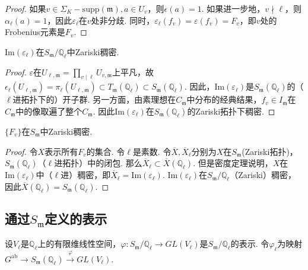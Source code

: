 \begin{proof}
    如果$v\in \Sigma_K - \mathrm{supp}(\mathfrak{m}), a\in U_v$，则$\epsilon(a) = 1$. 如果进一步地，$v\nmid \ell$，则$\alpha_{\ell}(a) = 1$，因此$\varepsilon_{\ell}$在$v$处非分歧. 同时，$\varepsilon_{\ell}(f_v)=\varepsilon(f_v) = F_v$，即$v$处的Frobenius元素是$F_v$.
\end{proof}

\begin{cthm}
    $\mathrm{Im}(\varepsilon_{\ell})$在$S_{\mathfrak{m}}/\mathbb{Q}_{\ell}$中Zariski稠密.
\end{cthm}

\begin{proof}
    $\varepsilon$在$U_{\ell, \mathfrak{m}} = \prod_{v\mid \ell} U_{v, \mathfrak{m}}$上平凡，故$\epsilon_{\ell}(U_{\ell, \mathfrak{m}}) = \pi_{\ell}(U_{\ell, \mathfrak{m}})\subset T_{\mathfrak{m}}(\mathbb{Q}_{\ell}) \subset S_{\mathfrak{m}}(\mathbb{Q}_{\ell})$. 因此，$\mathrm{Im}(\varepsilon_{\ell})$是$S_{\mathfrak{m}}(\mathbb{Q}_{\ell})$的（$\ell$进拓扑下的）开子群. 另一方面，由素理想在$C_{\mathfrak{m}}$中分布的经典结果，$f_v\in I_{\mathfrak{m}}$在$C_{\mathfrak{m}}$中的像取遍了整个$C_{\mathfrak{m}}$.
    因此$\mathrm{Im}(\varepsilon_{\ell})$在$S_{\mathfrak{m}}(\mathbb{Q}_{\ell})$的Zariski拓扑下稠密.
\end{proof}

\begin{ccor}
    $\{F_v\}$在$S_{\mathfrak{m}}$中Zariski稠密. \label{frob_dense}
\end{ccor}

\begin{proof}
    令$X$表示所有$F_v$的集合. 令$\ell$是素数. 令$\overline{X}, \overline{X}_{\ell}$分别为$X$在$S_{\mathfrak{m}}$(Zariski拓扑)，$S_{\mathfrak{m}}(\mathbb{Q}_{\ell})$（$\ell$进拓扑）中的闭包. 那么$\overline{X}_{\ell}\subset \overline{X}(\mathbb{Q}_{\ell})$. 但是\Chebotarev 密度定理说明，$X$在$\mathrm{Im}(\varepsilon_{\ell})$中（$\ell$进）稠密，即$\overline{X}_{\ell} = \mathrm{Im}(\varepsilon_{\ell})$. $\mathrm{Im}(\varepsilon_{\ell})$在$S_{\mathfrak{m}}/\mathbb{Q}_{\ell}$（Zariski）稠密，因此$\overline{X}(\mathbb{Q}_{\ell}) = S_{\mathfrak{m}}(\mathbb{Q}_{\ell})$.
\end{proof}

\subsection{通过\texorpdfstring{$S_{\mathfrak{m}}$}{Sm}定义的表示}

设$V_{\ell}$是$\mathbb{Q}_{\ell}$上的有限维线性空间，$\varphi: S_{\mathfrak{m}}/\mathbb{Q}_{\ell} \to GL(V_{\ell})$是$S_{\mathfrak{m}}/\mathbb{Q}_{\ell}$的表示. 令$\varphi_{\ell}$为映射$G^{\mathrm{ab}}\to S_{\mathfrak{m}}(\mathbb{Q}_{\ell})\xrightarrow{\varphi} GL(V_{\ell})$.


